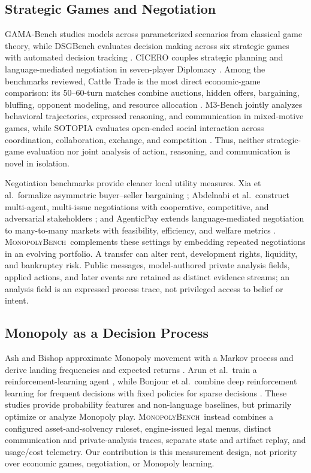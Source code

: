 \documentclass[conference]{IEEEtran}
\newcommand{\Bench}{\textsc{MonopolyBench}}
\begin{document}
\subsection{Strategic Games and Negotiation}

GAMA-Bench studies models across parameterized scenarios from classical game
theory, while DSGBench evaluates decision making across six strategic games
with automated decision tracking \cite{gamabench,dsgbench}. CICERO couples
strategic planning and language-mediated negotiation in seven-player
Diplomacy \cite{cicero}. Among the benchmarks reviewed, Cattle Trade is the
most direct economic-game comparison: its 50--60-turn matches combine
auctions, hidden offers, bargaining, bluffing, opponent modeling, and resource
allocation \cite{cattletrade}. M3-Bench jointly analyzes behavioral
trajectories, expressed reasoning, and communication in mixed-motive games,
while SOTOPIA evaluates open-ended social interaction across coordination,
collaboration, exchange, and competition \cite{m3bench,sotopia}. Thus, neither
strategic-game evaluation nor joint analysis of action, reasoning, and
communication is novel in isolation.

Negotiation benchmarks provide cleaner local utility measures. Xia et al.\
formalize asymmetric buyer--seller bargaining \cite{bargaining}; Abdelnabi
et al.\ construct multi-agent, multi-issue negotiations with cooperative,
competitive, and adversarial stakeholders \cite{stakeholder}; and
AgenticPay extends language-mediated negotiation to many-to-many markets with
feasibility, efficiency, and welfare metrics \cite{agenticpay}. \Bench\
complements these settings by embedding repeated negotiations in an evolving
portfolio. A transfer can alter rent, development rights, liquidity, and
bankruptcy risk. Public messages, model-authored private analysis fields,
applied actions, and later events are retained as distinct evidence streams;
an analysis field is an expressed process trace, not privileged access to
belief or intent.

\subsection{Monopoly as a Decision Process}

Ash and Bishop approximate Monopoly movement with a Markov process and derive
landing frequencies and expected returns \cite{monopoly_markov}. Arun et al.\
train a reinforcement-learning agent \cite{monopoly_rl}, while Bonjour et al.\
combine deep reinforcement learning for frequent decisions with fixed
policies for sparse decisions \cite{monopoly_drl}. These studies provide
probability features and non-language baselines, but primarily optimize or
analyze Monopoly play. \Bench\ instead combines a configured
asset-and-solvency ruleset, engine-issued legal menus, distinct communication
and private-analysis traces, separate state and artifact replay, and usage/cost
telemetry. Our contribution is this measurement design, not priority over
economic games, negotiation, or Monopoly learning.
\end{document}
